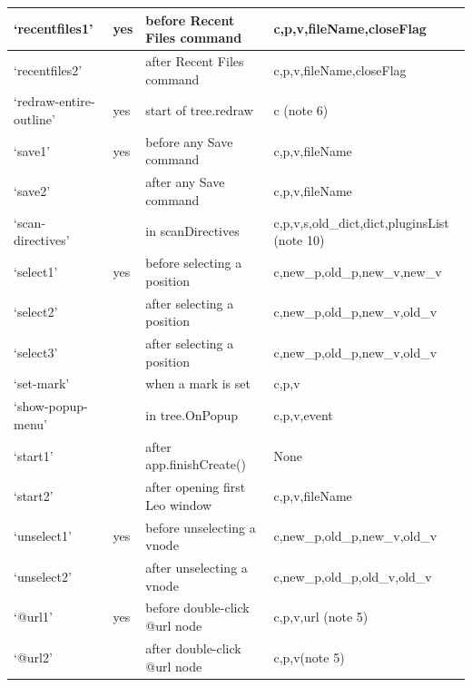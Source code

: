 \documentclass[a4paper,10pt,english]{sphinxmanual}
\begin{document}
\begin{longtable}{|l|l|l|l|}
`recentfiles1'
 & 
yes
 & 
before Recent Files command
 & 
c,p,v,fileName,closeFlag
\\\hline

`recentfiles2'
 &  & 
after  Recent Files command
 & 
c,p,v,fileName,closeFlag
\\\hline

`redraw-entire-outline'
 & 
yes
 & 
start of tree.redraw
 & 
c (note 6)
\\\hline

`save1'
 & 
yes
 & 
before any Save command
 & 
c,p,v,fileName
\\\hline

`save2'
 &  & 
after  any Save command
 & 
c,p,v,fileName
\\\hline

`scan-directives'
 &  & 
in scanDirectives
 & 
c,p,v,s,old\_dict,dict,pluginsList (note 10)
\\\hline

`select1'
 & 
yes
 & 
before selecting a position
 & 
c,new\_p,old\_p,new\_v,new\_v
\\\hline

`select2'
 &  & 
after  selecting a position
 & 
c,new\_p,old\_p,new\_v,old\_v
\\\hline

`select3'
 &  & 
after  selecting a position
 & 
c,new\_p,old\_p,new\_v,old\_v
\\\hline

`set-mark'
 &  & 
when a mark is set
 & 
c,p,v
\\\hline

`show-popup-menu'
 &  & 
in tree.OnPopup
 & 
c,p,v,event
\\\hline

`start1'
 &  & 
after app.finishCreate()
 & 
None
\\\hline

`start2'
 &  & 
after opening first Leo window
 & 
c,p,v,fileName
\\\hline

`unselect1'
 & 
yes
 & 
before unselecting a vnode
 & 
c,new\_p,old\_p,new\_v,old\_v
\\\hline

`unselect2'
 &  & 
after  unselecting a vnode
 & 
c,new\_p,old\_p,old\_v,old\_v
\\\hline

`@url1'
 & 
yes
 & 
before double-click @url node
 & 
c,p,v,url (note 5)
\\\hline

`@url2'
 &  & 
after  double-click @url node
 & 
c,p,v(note 5)
\\\hline
\end{longtable}
\end{document}
